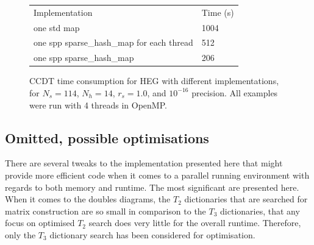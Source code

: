 \documentclass[10pt,twoside]{report}
\begin{document}
\begin{itemize}
		\begin{figure}[h]
			\centering
			\captionsetup{width=.8\textwidth}
			\begin{tabular}{ll}
				Implementation & Time (s) \\%
				one std map & 1004 \\
				one spp sparse\_hash\_map for each thread & 512 \\
				one spp sparse\_hash\_map & 206
			\end{tabular}
			\caption{CCDT time consumption for HEG with different implementations, for $N_s=114$, $N_h=14$, $r_s=1.0$, and $10^{-16}$ precision. All examples were run with 4 threads in OpenMP.}
			\label{Results | table | CCDT time table}
		\end{figure}
	\end{itemize}
	
	\subsection{Omitted, possible optimisations}
	There are several tweaks to the implementation presented here that might provide more efficient code when it comes to a parallel running environment with regards to both memory and runtime. The most significant are presented here. When it comes to the doubles diagrams, the $T_2$ dictionaries that are searched for matrix construction are so small in comparison to the $T_3$ dictionaries, that any focus on optimised $T_2$ search does very little for the overall runtime. Therefore, only the $T_3$ dictionary search has been considered for optimisation.
	
\end{document}
